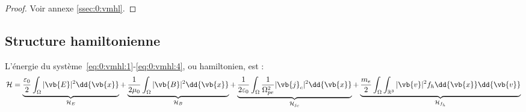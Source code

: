 \begin{proof}
  Voir annexe \ref{ssec:0:vmhl}.
\end{proof}

\subsection{Structure hamiltonienne}

L'énergie du système~\eqref{eq:0:vmhl:1}-\eqref{eq:0:vmhl:4}, ou hamiltonien, est :
\begin{equation}
  \mathcal{H} = \underbrace{\frac{\varepsilon_0}{2} \int_{\Omega} |\vb{E}|^2 \dd{\vb{x}} }_{\mathcal{H}_E}
              + \underbrace{\frac{1}{2\mu_0}        \int_{\Omega} |\vb{B}|^2 \dd{\vb{x}} }_{\mathcal{H}_B}
              + \underbrace{\frac{1}{2\varepsilon_0}\int_{\Omega} \frac{1}{\Omega_{pe}^2}|\vb{j}_c|^2 \dd{\vb{x}} }_{\mathcal{H}_{j_c}}
              + \underbrace{\frac{m_e}{2}           \int_{\Omega}\int_{\mathbb{R}^3} |\vb{v}|^2f_h \dd{\vb{x}}\dd{\vb{v}} }_{\mathcal{H}_{f_h}}
\end{equation}

